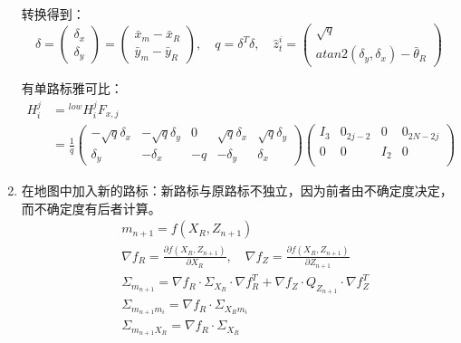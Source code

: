 \documentclass[
12pt, %
a4paper, 
oneside, %
headinclude,footinclude, %
]{scrartcl}
\begin{document}
\begin{enumerate}
转换得到：
$$
\delta = \begin{pmatrix} \delta_x \\ \delta_y \end{pmatrix} = \begin{pmatrix} \bar{x}_m - \bar{x}_R \\ \bar{y}_m - \bar{y}_R \end{pmatrix}, \quad
q = \delta^T \delta, \quad
\hat{z}_t^i = \begin{pmatrix} \sqrt{q} \\ atan2(\delta_y, \delta_x) - \bar{\theta}_R \end{pmatrix}
$$

有单路标雅可比：
\begin{align*}
H_i^j &= {}^{low} H_i^j F_{x, j} \\
&= \frac{1}{q} \begin{pmatrix} -\sqrt{q}\delta_x & -\sqrt{q}\delta_y & 0 & \sqrt{q}\delta_x & \sqrt{q}\delta_y \\ \delta_y & -\delta_x & -q & -\delta_y & \delta_x \end{pmatrix} \begin{pmatrix} I_3 & 0_{2j - 2} & 0 & 0_{2N - 2j} \\ 0 & 0 & I_2 & 0 \\ \end{pmatrix}
\end{align*}
\item 在地图中加入新的路标：新路标与原路标不独立，因为前者由不确定度决定，而不确定度有后者计算。
\begin{align*}
&m_{n + 1} = f(X_R, Z_{n + 1}) \\
&\nabla f_R = \frac{\partial f(X_R, Z_{n + 1})}{\partial X_R}, \quad \nabla f_Z = \frac{\partial f(X_R, Z_{n + 1})}{\partial Z_{n + 1}} \\
&\Sigma_{m_{n + 1}} = \nabla f_R \cdot \Sigma_{X_R} \cdot \nabla f_R^T + \nabla f_Z \cdot Q_{Z_{n + 1}} \cdot \nabla f_Z^T \\\
&\Sigma_{m_{n + 1}m_i} = \nabla f_R \cdot \Sigma_{X_R m_i} \\
&\Sigma_{m_{n + 1}X_R} = \nabla f_R \cdot \Sigma_{X_R}
\end{align*}


\end{enumerate}
\end{document}
